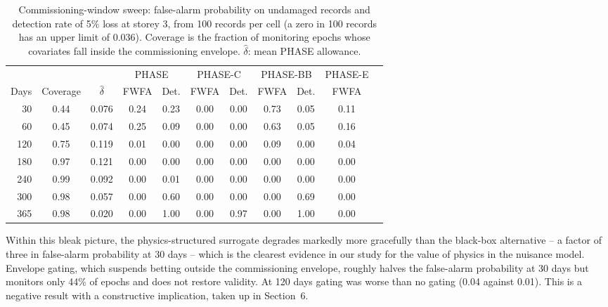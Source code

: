 \documentclass[12pt,a4paper]{article}
\newcommand{\rev}[1]{#1}
\newenvironment{revblock}{}{}
\newcommand{\rev}[1]{{\color{revcol}#1}}
\newenvironment{revblock}{\begingroup\color{revcol}}{\endgroup}
\begin{document}
\begin{table}[t]
\centering
\scriptsize
\begin{revblock}
\caption{Commissioning-window sweep: false-alarm probability on undamaged records and detection rate of 5\% loss at storey 3, from 100 records per cell (a zero in 100 records has an upper limit of 0.036). Coverage is the fraction of monitoring epochs whose covariates fall inside the commissioning envelope. $\hat\delta$: mean PHASE allowance.}
\label{tab:burn}
\setlength{\tabcolsep}{3.5pt}
\begin{tabular}{rcccccccccc}
\toprule
 & & & \multicolumn{2}{c}{PHASE} & \multicolumn{2}{c}{PHASE-C} & \multicolumn{2}{c}{PHASE-BB} & PHASE-E \\
\cmidrule(lr){4-5}\cmidrule(lr){6-7}\cmidrule(lr){8-9}\cmidrule(lr){10-10}
Days & Coverage & $\hat\delta$ & FWFA & Det. & FWFA & Det. & FWFA & Det. & FWFA \\
\midrule
30 & 0.44 & 0.076 & 0.24 & 0.23 & 0.00 & 0.00 & 0.73 & 0.05 & 0.11 \\
60 & 0.45 & 0.074 & 0.25 & 0.09 & 0.00 & 0.00 & 0.63 & 0.05 & 0.16 \\
120 & 0.75 & 0.119 & 0.01 & 0.00 & 0.00 & 0.00 & 0.09 & 0.00 & 0.04 \\
180 & 0.97 & 0.121 & 0.00 & 0.00 & 0.00 & 0.00 & 0.00 & 0.00 & 0.00 \\
240 & 0.99 & 0.092 & 0.00 & 0.01 & 0.00 & 0.00 & 0.00 & 0.00 & 0.00 \\
300 & 0.98 & 0.057 & 0.00 & 0.60 & 0.00 & 0.00 & 0.00 & 0.69 & 0.00 \\
365 & 0.98 & 0.020 & 0.00 & 1.00 & 0.00 & 0.97 & 0.00 & 1.00 & 0.00 \\
\bottomrule
\end{tabular}
\end{revblock}
\end{table}

Within this bleak picture, the physics-structured surrogate degrades markedly more gracefully than the black-box alternative -- a factor of three in false-alarm probability at 30 days -- which is the clearest evidence in our study for the value of physics in the nuisance model. Envelope gating, which suspends betting outside the commissioning envelope, roughly halves the false-alarm probability at 30 days but monitors only 44\% of epochs and does not restore validity. \rev{At 120 days gating was worse than no gating (0.04 against 0.01).} This is a negative result with a constructive implication, taken up in Section~6.
\end{document}
